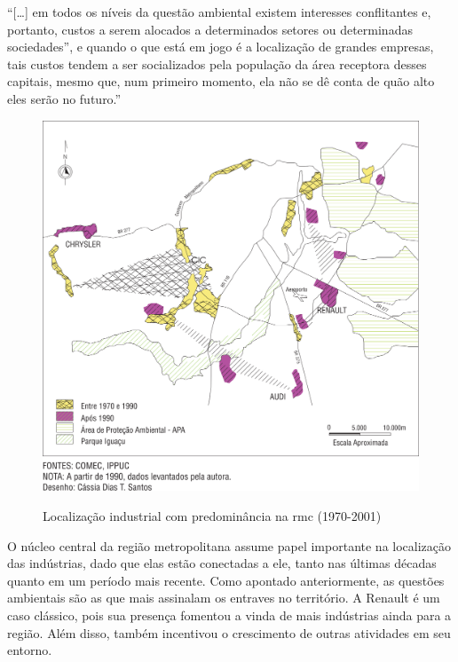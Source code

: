 	\begin{citacao}
		``[\dots] em todos os níveis da questão ambiental existem interesses conflitantes e, portanto, custos a serem alocados a determinados setores ou determinadas sociedades”, e quando o que está em jogo é a localização de grandes empresas, tais custos tendem a ser socializados pela população da área receptora desses capitais, mesmo que, num primeiro momento, ela não se dê conta de quão alto eles serão no futuro.'' 
	\end{citacao}

	\begin{figure}
		\centering
		\caption{Localização industrial com predominância na \gls{rmc} (1970-2001)}
		\includegraphics[width=1.0\linewidth]{img/firkowski2002b_01}
		\label{fig:firkowski2002b}
	\end{figure}

	O núcleo central da região metropolitana assume papel importante na localização das indústrias, dado que elas estão conectadas a ele, tanto nas últimas décadas quanto em um período mais recente.  Como apontado anteriormente, as questões ambientais são as que mais assinalam os entraves no território. A Renault é um caso clássico, pois sua presença fomentou a vinda de mais indústrias ainda para a região. Além disso, também incentivou o crescimento de outras atividades em seu entorno. 
	

